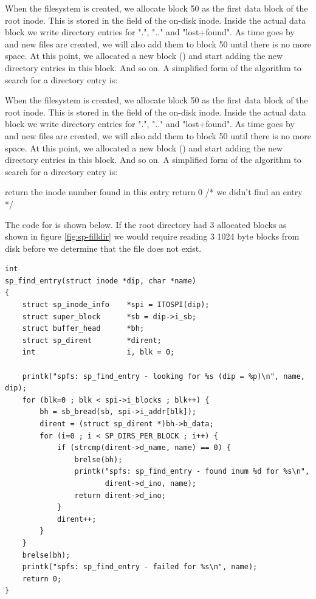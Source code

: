When the filesystem is created, we allocate block 50 as the first data block of the root inode. This is stored in the  field of the on-disk inode. Inside the actual data block we write directory entries for ".", ".." and "lost+found". As time goes by and new files are created, we will also add them to block 50 until there is no more space. At this point, we allocated a new block () and start adding the new directory entries in this block. And so on. A simplified form of the algorithm to search for a directory entry is:

When the filesystem is created, we allocate block 50 as the first data block of the root inode. This is stored in the  field of the on-disk inode. Inside the actual data block we write directory entries for ".", ".." and "lost+found". As time goes by and new files are created, we will also add them to block 50 until there is no more space. At this point, we allocated a new block () and start adding the new directory entries in this block. And so on. A simplified form of the algorithm to search for a directory entry is:
\smallskip

\noindent
\begin{algorithmic}
\State return the inode number found in this entry
\EndIf
\EndFor
\EndFor
\State return 0 /* we didn't find an entry */
\end{algorithmic}

\bigskip
\noindent
The code for  is shown below. If the root directory had 3 allocated blocks as shown in figure \ref{fig:sp-filldir} we would require reading 3 1024 byte blocks from disk before we determine that the file does not exist.

\begin{lstlisting}
int
sp_find_entry(struct inode *dip, char *name)
{
    struct sp_inode_info    *spi = ITOSPI(dip);
    struct super_block      *sb = dip->i_sb;
    struct buffer_head      *bh;
    struct sp_dirent        *dirent;
    int                     i, blk = 0;

    printk("spfs: sp_find_entry - looking for %s (dip = %p)\n", name, dip);
    for (blk=0 ; blk < spi->i_blocks ; blk++) {
        bh = sb_bread(sb, spi->i_addr[blk]);
        dirent = (struct sp_dirent *)bh->b_data;
        for (i=0 ; i < SP_DIRS_PER_BLOCK ; i++) {
            if (strcmp(dirent->d_name, name) == 0) {
                brelse(bh);
                printk("spfs: sp_find_entry - found inum %d for %s\n",
                       dirent->d_ino, name);
                return dirent->d_ino;
            }
            dirent++;
        }
    }
    brelse(bh);
    printk("spfs: sp_find_entry - failed for %s\n", name);
    return 0;
}
\end{lstlisting}

